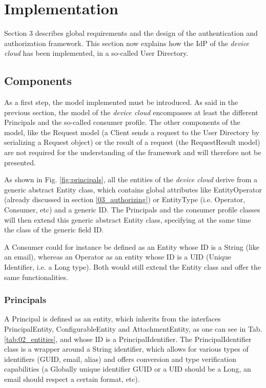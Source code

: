 \chapter{Implementation}
\label{cha:implementation}

Section 3 describes global requirements and the design of the authentication and authorization framework. This section now explains how the IdP of the \emph{device cloud} has been implemented, in a so-called User Directory.

\section{Components}
As a first step, the model implemented must be introduced. As said in the previous section, the model of the \emph{device cloud} encompasses at least the different Principals and the so-called consumer profile. The other components of the model, like the Request model (a Client sends a request to the User Directory by serializing a Request object) or the result of a request (the RequestResult model) are not required for the understanding of the framework and will therefore not be presented.

As shown in Fig. \ref{fig:principals}, all the entities of the \emph{device cloud} derive from a generic abstract Entity class, which contains global attributes like EntityOperator (already discussed in section \ref{03_authorizing}) or EntityType (i.e. Operator, Consumer, etc) and a generic ID. The Principals and the consumer profile classes will then extend this generic abstract Entity class, specifying at the same time the class of the generic field ID.

A Consumer could for instance be defined as an Entity whose ID is a String (like an email), whereas an Operator as an entity whose ID is a UID (Unique Identifier, i.e. a Long type). Both would still extend the Entity class and offer the same functionalities.

\subsection{Principals}
A Principal is defined as an entity, which inherits from the interfaces PrincipalEntity, ConfigurableEntity and AttachmentEntity, as one can see in Tab. \ref{tab:02_entities}, and whose ID is a PrincipalIdentifier. The PrincipalIdentifier class is a wrapper around a String identifier, which allows for various types of identifiers (GUID, email, alias) and offers conversion and type verification capabilities (a Globally unique identifier GUID or a UID should be a Long, an email should respect a certain format, etc).

